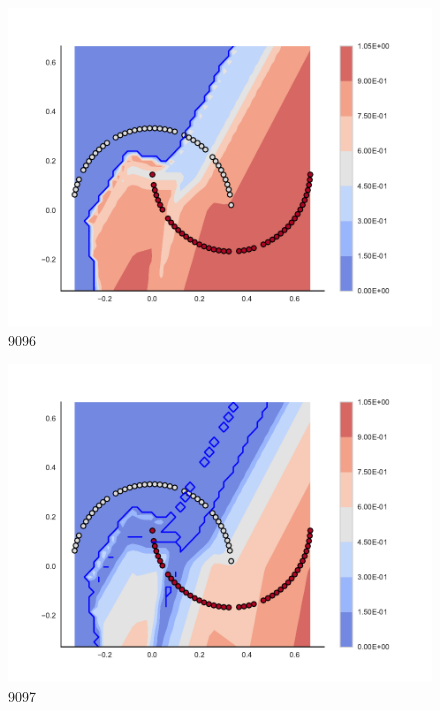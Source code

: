\begin{subfigure}[b]{0.09\textwidth}
    \includegraphics[clip, trim=2.35cm 1.75cm 4.5cm 0cm,width=\textwidth]{img/convergence/9096.pdf}
    \caption{9096}
    \label{fig:convergence_9096}
\end{subfigure}
%
\begin{subfigure}[b]{0.09\textwidth}
    \includegraphics[clip, trim=2.35cm 1.75cm 4.5cm 0cm,width=\textwidth]{img/convergence/9097.pdf}
    \caption{9097}
    \label{fig:convergence_9097}
\end{subfigure}
%
